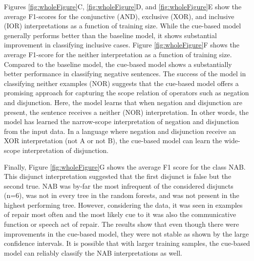 \documentclass[
  ,man,floatsintext]{apa6}
\begin{document}
Figures \ref{fig:wholeFigure}C, \ref{fig:wholeFigure}D, and \ref{fig:wholeFigure}E show the average F1-scores for the conjunctive (AND), exclusive (XOR), and inclusive (IOR) interpretations as a function of training size. While the cue-based model generally performs better than the baseline model, it shows substantial improvement in classifying inclusive cases. Figure \ref{fig:wholeFigure}F shows the average F1-score for the neither interpretation as a function of training size. Compared to the baseline model, the cue-based model shows a substantially better performance in classifying negative sentences. The success of the model in classifying neither examples (NOR) suggests that the cue-based model offers a promising approach for capturing the scope relation of operators such as negation and disjunction. Here, the model learns that when negation and disjunction are present, the sentence receives a neither (NOR) interpretation. In other words, the model has learned the narrow-scope interpretation of negation and disjunction from the input data. In a language where negation and disjunction receive an XOR interpretation (not A or not B), the cue-based model can learn the wide-scope interpretation of disjunction.

Finally, Figure \ref{fig:wholeFigure}G shows the average F1 score for the class NAB. This disjunct interpretation suggested that the first disjunct is false but the second true. NAB was by-far the most infrequent of the considered disjuncts (n=6), was not in every tree in the random forests, and was not present in the highest performing tree. However, considering the data, it was seen in examples of repair most often and the most likely cue to it was also the communicative function or speech act of repair. The results show that even though there were improvements in the cue-based model, they were not stable as shown by the large confidence intervals. It is possible that with larger training samples, the cue-based model can reliably classify the NAB interpretations as well.
\end{document}
